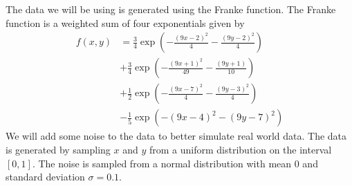 \documentclass[twoside,11pt]{report}
\begin{document}
The data we will be using is generated using the Franke function. The Franke function is a weighted sum of four exponentials given by
\begin{align*}
    f(x,y) &= \frac{3}{4}\exp\left(-\frac{(9x-2)^2}{4}-\frac{(9y-2)^2}{4}\right)\\
    &+ \frac{3}{4}\exp\left(-\frac{(9x+1)^2}{49}-\frac{(9y+1)}{10}\right)\\
    &+ \frac{1}{2}\exp\left(-\frac{(9x-7)^2}{4}-\frac{(9y-3)^2}{4}\right)\\
    &- \frac{1}{5}\exp\left(-(9x-4)^2-(9y-7)^2\right)
\end{align*}
We will add some noise to the data to better simulate real world data. The data is generated by sampling $x$ and $y$ from a uniform distribution on the interval $[0,1]$. The noise is sampled from a normal distribution with mean 0 and standard deviation $\sigma = 0.1$.
\end{document}
